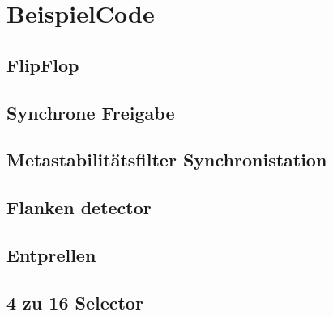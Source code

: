 \section{BeispielCode}
\subsection{FlipFlop}


\subsection{Synchrone Freigabe}


\subsection{Metastabilitätsfilter Synchronistation}


\subsection{Flanken detector}


\subsection{Entprellen}


\subsection{4 zu 16 Selector}


